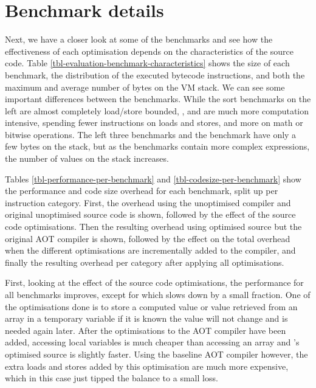 \section{Benchmark details}
\label{sec-evaluation-benchmark-details}
Next, we have a closer look at some of the benchmarks and see how the effectiveness of each optimisation depends on the characteristics of the source code. Table \ref{tbl-evaluation-benchmark-characteristics} shows the size of each benchmark, the distribution of the executed bytecode instructions, and both the maximum and average number of bytes on the VM stack. We can see some important differences between the benchmarks. While the sort benchmarks on the left are almost completely load/store bounded, ,  and  are much more computation intensive, spending fewer instructions on loads and stores, and more on math or bitwise operations. The left three benchmarks and the  benchmark have only a few bytes on the stack, but as the benchmarks contain more complex expressions, the number of values on the stack increases.

Tables \ref{tbl-performance-per-benchmark} and \ref{tbl-codesize-per-benchmark} show the performance and code size overhead for each benchmark, split up per instruction category. First, the overhead using the unoptimised compiler and original unoptimised source code is shown, followed by the effect of the source code optimisations. Then the resulting overhead using optimised source but the original AOT compiler is shown, followed by the effect on the total overhead when the different optimisations are incrementally added to the compiler, and finally the resulting overhead per category after applying all optimisations.

First, looking at the effect of the source code optimisations, the performance for all benchmarks improves, except for  which slows down by a small fraction. One of the optimisations done is to store a computed value or value retrieved from an array in a temporary variable if it is known the value will not change and is needed again later. After the optimisations to the AOT compiler have been added, accessing local variables is much cheaper than accessing an array and 's optimised source is slightly faster. Using the baseline AOT compiler however, the extra loads and stores added by this optimisation are much more expensive, which in this case just tipped the balance to a small loss. 

